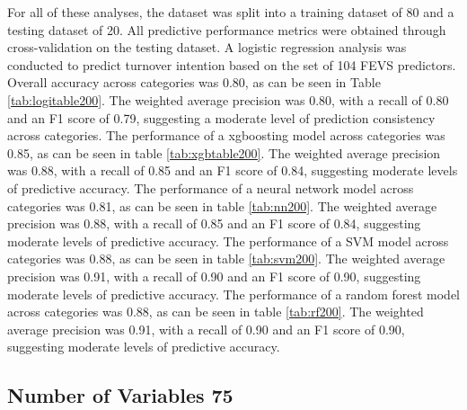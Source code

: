 \documentclass[
  man]{apa7}
\begin{document}
For all of these analyses, the dataset was split into a training dataset of 80 and a testing dataset of 20. All predictive performance metrics were obtained through cross-validation on the testing dataset. A logistic regression analysis was conducted to predict turnover intention based on the set of 104 FEVS predictors. Overall accuracy across categories was 0.80, as can be seen in Table \ref{tab:logitable200}. The weighted average precision was 0.80, with a recall of 0.80 and an F1 score of 0.79, suggesting a moderate level of prediction consistency across categories.
The performance of a xgboosting model across categories was 0.85, as can be seen in table \ref{tab:xgbtable200}. The weighted average precision was 0.88, with a recall of 0.85 and an F1 score of 0.84, suggesting moderate levels of predictive accuracy.
The performance of a neural network model across categories was 0.81, as can be seen in table \ref{tab:nn200}. The weighted average precision was 0.88, with a recall of 0.85 and an F1 score of 0.84, suggesting moderate levels of predictive accuracy.
The performance of a SVM model across categories was 0.88, as can be seen in table \ref{tab:svm200}. The weighted average precision was 0.91, with a recall of 0.90 and an F1 score of 0.90, suggesting moderate levels of predictive accuracy.
The performance of a random forest model across categories was 0.88, as can be seen in table \ref{tab:rf200}. The weighted average precision was 0.91, with a recall of 0.90 and an F1 score of 0.90, suggesting moderate levels of predictive accuracy.

\subsection{Number of Variables 75}\label{number-of-variables-75}
\end{document}
